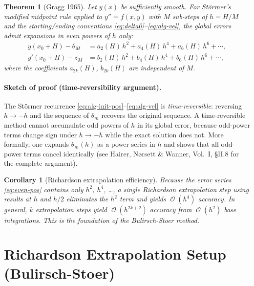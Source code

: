 \documentclass[11pt]{article}
\newtheorem{theorem}{Theorem}
\newtheorem{corollary}{Corollary}
\DeclareMathOperator{\OO}{\mathcal{O}}
\begin{document}
\begin{theorem}[Gragg 1965]
  \label{thm:gragg}
  Let $y(x)$ be sufficiently smooth.  For Störmer's modified midpoint rule applied
  to $y'' = f(x, y)$ with $M$ sub-steps of $h = H/M$ and the starting/ending
  conventions \eqref{eq:delta0}--\eqref{eq:alg-vel}, the global errors admit
  expansions in \emph{even powers} of $h$ only:
  \begin{align}
    y(x_0 + H) - \theta_M &= a_2(H)\, h^2 + a_4(H)\, h^4 + a_6(H)\, h^6 + \cdots,
    \label{eq:even-pos} \\
    y'(x_0 + H) - z_M    &= b_2(H)\, h^2 + b_4(H)\, h^4 + b_6(H)\, h^6 + \cdots,
    \label{eq:even-vel}
  \end{align}
  where the coefficients $a_{2k}(H)$, $b_{2k}(H)$ are independent of $M$.
\end{theorem}

\paragraph{Sketch of proof (time-reversibility argument).}
The Störmer recurrence \eqref{eq:alg-init-pos}--\eqref{eq:alg-vel} is
\emph{time-reversible}: reversing $h \to -h$ and the sequence of $\theta_m$
recovers the original sequence.  A time-reversible method cannot accumulate odd
powers of $h$ in its global error, because odd-power terms change sign under
$h \to -h$ while the exact solution does not.  More formally, one expands
$\theta_m(h)$ as a power series in $h$ and shows that all odd-power terms cancel
identically (see Hairer, Nørsett \& Wanner, Vol.~I, §II.8 for the complete
argument).

\begin{corollary}[Richardson extrapolation efficiency]
  Because the error series \eqref{eq:even-pos} contains only $h^2$, $h^4$, \ldots,
  a single Richardson extrapolation step using results at $h$ and $h/2$ eliminates
  the $h^2$ term and yields $\OO(h^4)$ accuracy.  In general, $k$ extrapolation
  steps yield $\OO(h^{2k+2})$ accuracy from $\OO(h^2)$ base integrations.  This
  is the foundation of the Bulirsch-Stoer method.
\end{corollary}

\section{Richardson Extrapolation Setup (Bulirsch-Stoer)}
\end{document}
